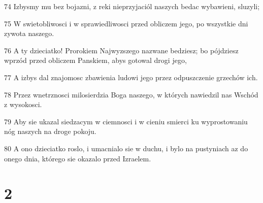 \par 74 Izbysmy mu bez bojazni, z reki nieprzyjaciól naszych bedac wybawieni, sluzyli;
\par 75 W swietobliwosci i w sprawiedliwosci przed obliczem jego, po wszystkie dni zywota naszego.
\par 76 A ty dzieciatko! Prorokiem Najwyzszego nazwane bedziesz; bo pójdziesz wprzód przed obliczem Panskiem, abys gotowal drogi jego,
\par 77 A izbys dal znajomosc zbawienia ludowi jego przez odpuszczenie grzechów ich.
\par 78 Przez wnetrznosci milosierdzia Boga naszego, w których nawiedzil nas Wschód z wysokosci.
\par 79 Aby sie ukazal siedzacym w ciemnosci i w cieniu smierci ku wyprostowaniu nóg naszych na droge pokoju.
\par 80 A ono dzieciatko roslo, i umacnialo sie w duchu, i bylo na pustyniach az do onego dnia, którego sie okazalo przed Izraelem.

\chapter{2}


